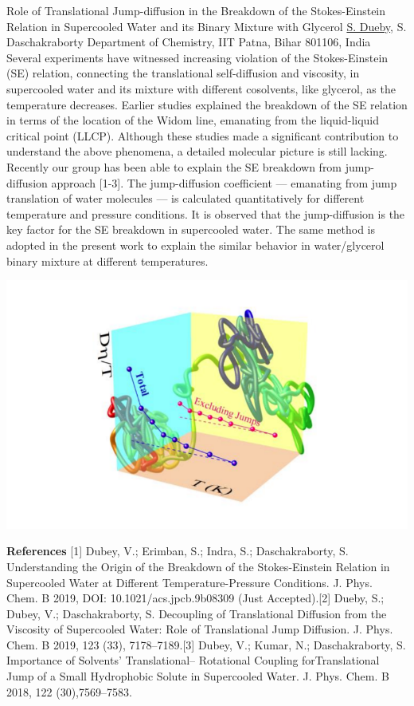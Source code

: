 
    \begin{abstract_online}{Role of Translational Jump-diffusion in the Breakdown of the Stokes-Einstein Relation in Supercooled Water and its Binary Mixture with Glycerol}{%
        \underline{S. Dueby}, S. Daschakraborty}{%
        }{%
        Department of Chemistry, IIT Patna, Bihar 801106, India}
    Several experiments have witnessed increasing violation of the Stokes-Einstein (SE) relation, connecting the translational self-diffusion and viscosity, in supercooled water and its mixture with different cosolvents, like glycerol, as the temperature decreases. Earlier studies explained the breakdown of the SE relation in terms of the location of the Widom line, emanating from the liquid-liquid critical point (LLCP). Although these studies made a significant contribution to understand the above phenomena, a detailed molecular picture is still lacking. Recently our group has been able to explain the SE breakdown from jump-diffusion approach [1-3]. The jump-diffusion coefficient — emanating from jump translation of water molecules — is calculated quantitatively for different temperature and pressure conditions. It is observed that the jump-diffusion is the key factor for the SE breakdown in supercooled water. The same method is adopted in the present work to explain the similar behavior in water/glycerol binary mixture at different temperatures. \begin{center}  \includegraphics[width=0.8\linewidth]{abstracts/txt/figures/dueby.png}  \end{center}  
    
        \textbf{References} \newline{}[1] Dubey, V.; Erimban, S.; Indra, S.; Daschakraborty, S. Understanding the Origin of the Breakdown of the Stokes-Einstein Relation in Supercooled Water at Different Temperature-Pressure Conditions. J. Phys. Chem. B 2019, DOI: 10.1021/acs.jpcb.9b08309 (Just Accepted).\newline{}[2] Dueby, S.; Dubey, V.; Daschakraborty, S. Decoupling of Translational Diffusion from the Viscosity of Supercooled Water: Role of Translational Jump Diffusion. J. Phys. Chem. B 2019, 123 (33), 7178–7189.\newline{}[3] Dubey, V.; Kumar, N.; Daschakraborty, S. Importance of Solvents’ Translational– Rotational Coupling for\newline{}Translational Jump of a Small Hydrophobic Solute in Supercooled Water. J. Phys. Chem. B 2018, 122 (30),\newline{}7569–7583.
    \end{abstract_online}
    